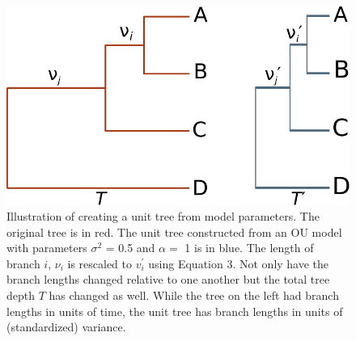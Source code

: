 \documentclass[a4paper,12pt]{article}
\begin{document}
\begin{figure}[p]
  \centering
  \includegraphics{figs/unit-tree}
  \caption{Illustration of creating a unit tree from model parameters. The original tree is in red. The unit tree constructed from an OU model with parameters $\sigma^2$ = 0.5 and $\alpha=$ 1 is in blue. The length of branch $i$, $\nu_i$ is rescaled to $v_i^\prime$ using Equation 3. Not only have the branch lengths changed relative to one another but the total tree depth $T$ has changed as well. While the tree on the left had branch lengths in units of time, the unit tree has branch lengths in units of (standardized) variance.}
  \label{fig:box1}
\end{figure}
\end{document}

